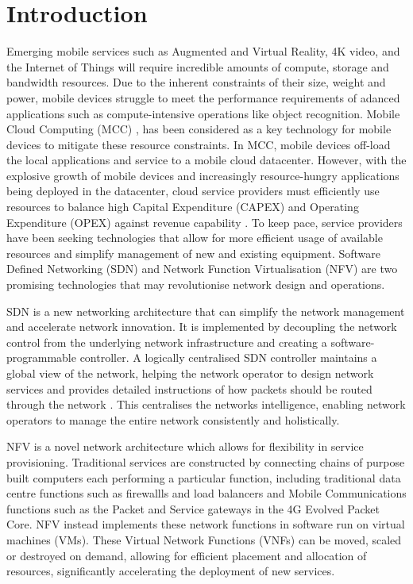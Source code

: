 
\section{Introduction}
\label{sec:introduction}

Emerging mobile services such as Augmented and Virtual Reality, 4K video, and the Internet of Things will require incredible amounts of compute, storage and bandwidth resources\cite{AndrewsBCHLSZ14}. Due to the inherent constraints of their size, weight and power, mobile devices struggle to meet the performance requirements of adanced applications such as compute-intensive operations like object recognition. Mobile Cloud Computing (MCC) \cite{7809047}, \cite{7364240} has been considered as a key technology for mobile devices to mitigate these resource constraints. In MCC, mobile devices off-load the local applications and service to a mobile cloud datacenter. However, with the explosive growth of mobile devices and increasingly resource-hungry applications being deployed in the datacenter, cloud service providers must efficiently use resources to balance high Capital Expenditure (CAPEX) and Operating Expenditure (OPEX) against revenue capability \cite{VahdatAFMPR10}. To keep pace, service providers have been seeking technologies that allow for more efficient usage of available resources and simplify management of new and existing equipment. Software Defined Networking (SDN) and Network Function Virtualisation (NFV) are two promising technologies that may revolutionise network design and operations.

SDN is a new networking architecture that can simplify the network management and accelerate network innovation. It is implemented by decoupling the network control from the underlying network infrastructure and creating a software-programmable controller. A logically centralised SDN controller maintains a global view of the network, helping the network operator to design network services and provides detailed instructions of how packets should be routed through the network \cite{KimF13,HaresW13}. This centralises the networks intelligence, enabling network operators to manage the entire network consistently and holistically. 

NFV is a novel network architecture which allows for flexibility in service provisioning. Traditional services are constructed by connecting chains of purpose built computers each performing a particular function, including traditional data centre functions such as firewallls and load balancers and Mobile Communications functions such as the Packet and Service gateways in the 4G Evolved Packet Core. NFV instead implements these network functions in software run on virtual machines (VMs). These Virtual Network Functions (VNFs) can be moved, scaled or destroyed on demand, allowing for efficient placement and allocation of resources, significantly accelerating the deployment of new services. 

